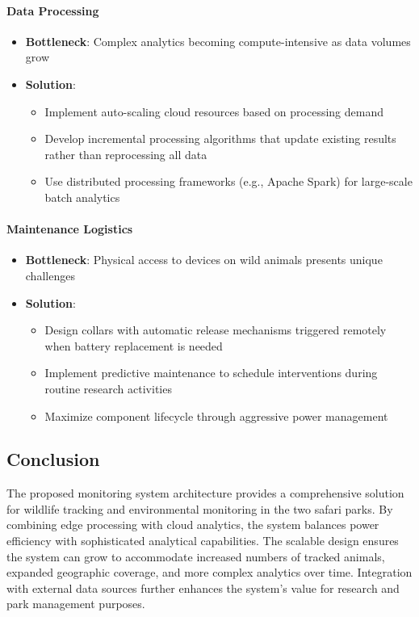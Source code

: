 \paragraph{Data Processing}
\begin{itemize}
  \item \textbf{Bottleneck}: Complex analytics becoming compute-intensive as data volumes grow
  \item \textbf{Solution}:
    \begin{itemize}
      \item Implement auto-scaling cloud resources based on processing demand
      \item Develop incremental processing algorithms that update existing results rather than reprocessing all data
      \item Use distributed processing frameworks (e.g., Apache Spark) for large-scale batch analytics
    \end{itemize}
\end{itemize}

\paragraph{Maintenance Logistics}
\begin{itemize}
  \item \textbf{Bottleneck}: Physical access to devices on wild animals presents unique challenges
  \item \textbf{Solution}:
    \begin{itemize}
      \item Design collars with automatic release mechanisms triggered remotely when battery replacement is needed
      \item Implement predictive maintenance to schedule interventions during routine research activities
      \item Maximize component lifecycle through aggressive power management
    \end{itemize}
\end{itemize}

\subsection{Conclusion}
The proposed monitoring system architecture provides a comprehensive solution for wildlife tracking and environmental monitoring in the two safari parks. By combining edge processing with cloud analytics, the system balances power efficiency with sophisticated analytical capabilities. The scalable design ensures the system can grow to accommodate increased numbers of tracked animals, expanded geographic coverage, and more complex analytics over time. Integration with external data sources further enhances the system's value for research and park management purposes.

